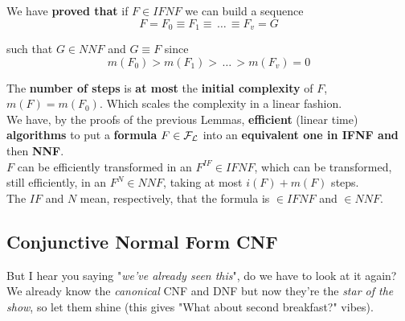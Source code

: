 	\newpage

	We have \textbf{proved that} if $F \in IFNF$ we can build a sequence
	$$ F = F_0 \equiv F_1 \equiv \, \dots \, \equiv F_v = G$$

	such that $G \in NNF$ and $G \equiv F$ since
	$$ m(F_0) > m(F_1) > \, \dots \, > m(F_v) = 0 $$

	The \textbf{number of steps} is \textbf{at most} the \textbf{initial complexity} of $F$, $m(F) = m(F_0)$. Which scales the complexity in a linear fashion.\\

	We have, by the proofs of the previous Lemmas, \textbf{efficient} (linear time) \textbf{algorithms} to put a \textbf{formula} $F \in \mathcal{F}_\mathcal{L}$ into an \textbf{equivalent one in IFNF and} then \textbf{NNF}. \\

	$F$ can be efficiently transformed in an $F^{IF} \in IFNF$, which can be transformed, still efficiently, in an $F^{N} \in NNF$, taking at most $i(F) + m(F)$ steps.\\

	The $IF$ and $N$ mean, respectively, that the formula is $\in IFNF$ and $\in NNF$.\\

%

	\newpage

	\subsection{Conjunctive Normal Form CNF}

	But I hear you saying "\textit{we've already seen this}", do we have to look at it again? We already know the \textit{canonical} CNF and DNF but now they're the \textit{star of the show}, so let them shine (this gives "What about second breakfast?" vibes).\\

